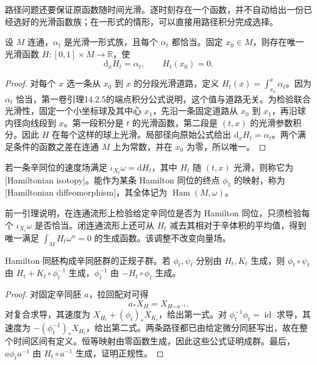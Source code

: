 路径问题还要保证原函数随时间光滑。逐时刻存在一个函数，并不自动给出一份已经选好的光滑函数族；在一形式的情形，可以直接用路径积分完成选择。

\begin{lemma}\label{g4:lem:0903:smooth-potentials}
	设 \(M\) 连通，\(\alpha_t\) 是光滑一形式族，且每个 \(\alpha_t\) 都恰当。固定 \(x_0\in M\)，则存在唯一光滑函数 \(H:[0,1]\times M\to\mathbb R\)，使
	\[
		\mathrm{d}_xH_t=\alpha_t,\qquad H_t(x_0)=0.
	\]
\end{lemma}
\begin{proof}
	对每个 \(x\) 选一条从 \(x_0\) 到 \(x\) 的分段光滑道路，定义 \(H_t(x)=\int_{x_0}^x\alpha_t\)。因为 \(\alpha_t\) 恰当，第一卷引理14.2.5的端点积分公式说明，这个值与道路无关。为检验联合光滑性，固定一个小坐标球及其中心 \(x_1\)，先沿一条固定道路从 \(x_0\) 到 \(x_1\)，再沿球内径向线段到 \(x\)。第一段积分是 \(t\) 的光滑函数，第二段是 \((t,x)\) 的光滑参数积分。因此 \(H\) 在每个这样的球上光滑。局部径向原始公式给出 \(\mathrm{d}_xH_t=\alpha_t\)。两个满足条件的函数之差在连通 \(M\) 上为常数，并在 \(x_0\) 为零，所以唯一。
\end{proof}

\begin{definition}\label{g4:def:0903:hamiltonian-isotopy}
	若一条辛同位的速度场满足 \(\iota_{X_t}\omega=\mathrm{d}H_t\)，其中 \(H_t\) 随 \((t,x)\) 光滑，则称它为[Hamiltonian isotopy]。能作为某条 Hamilton 同位的终点 \(\phi_1\) 的映射，称为[Hamiltonian diffeomorphism]，其全体记为 \(\operatorname{Ham}(M,\omega)\)。
\end{definition}

前一引理说明，在连通流形上检验给定辛同位是否为 Hamilton 同位，只须检验每个 \(\iota_{X_t}\omega\) 是否恰当。闭连通流形上还可从 \(H_t\) 减去其相对于辛体积的平均值，得到唯一满足 \(\int_M H_t\omega^n=0\) 的生成函数。该调整不改变向量场。

\begin{proposition}\label{g4:prop:0903:hamiltonian-group}
	Hamilton 同胚构成辛同胚群的正规子群。若 \(\phi_t,\psi_t\) 分别由 \(H_t,K_t\) 生成，则 \(\phi_t\circ\psi_t\) 由 \(H_t+K_t\circ\phi_t^{-1}\) 生成，\(\phi_t^{-1}\) 由 \(-H_t\circ\phi_t\) 生成。
\end{proposition}
\begin{proof}
	对固定辛同胚 \(a\)，拉回配对可得
	\[
		a_*X_H=X_{H\circ a^{-1}}.
	\]
	对复合求导，其速度为 \(X_{H_t}+(\phi_t)_*X_{K_t}\)，给出第一式。对 \(\phi_t^{-1}\phi_t=\operatorname{id}\) 求导，其速度为 \(- (\phi_t^{-1})_*X_{H_t}\)，给出第二式。两条路径都已由给定微分同胚写出，故在整个时间区间有定义。恒等映射由零函数生成，因此这些公式证明成群。最后，\(a\phi_ta^{-1}\) 由 \(H_t\circ a^{-1}\) 生成，证明正规性。
\end{proof}

